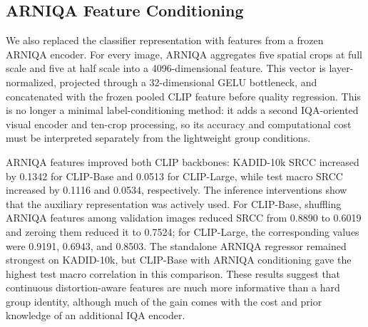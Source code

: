 \documentclass{article}
\begin{document}
\subsection{ARNIQA Feature Conditioning}

We also replaced the classifier representation with features from a frozen ARNIQA encoder. For every image, ARNIQA aggregates five spatial crops at full scale and five at half scale into a 4096-dimensional feature. This vector is layer-normalized, projected through a 32-dimensional GELU bottleneck, and concatenated with the frozen pooled CLIP feature before quality regression. This is no longer a minimal label-conditioning method: it adds a second IQA-oriented visual encoder and ten-crop processing, so its accuracy and computational cost must be interpreted separately from the lightweight group conditions.

\begin{table}[htbp]
\centering
\small
\setlength{\tabcolsep}{4pt}
\caption{ARNIQA feature conditioning. CLIP comparisons use the best KADID-10k validation checkpoint; test values are seven-dataset macro averages. The standalone official ARNIQA regressor is included as a reference rather than a capacity-matched baseline.}
\label{tab:arniqa-features}
\end{table}

ARNIQA features improved both CLIP backbones: KADID-10k SRCC increased by 0.1342 for CLIP-Base and 0.0513 for CLIP-Large, while test macro SRCC increased by 0.1116 and 0.0534, respectively. The inference interventions show that the auxiliary representation was actively used. For CLIP-Base, shuffling ARNIQA features among validation images reduced SRCC from 0.8890 to 0.6019 and zeroing them reduced it to 0.7524; for CLIP-Large, the corresponding values were 0.9191, 0.6943, and 0.8503. The standalone ARNIQA regressor remained strongest on KADID-10k, but CLIP-Base with ARNIQA conditioning gave the highest test macro correlation in this comparison. These results suggest that continuous distortion-aware features are much more informative than a hard group identity, although much of the gain comes with the cost and prior knowledge of an additional IQA encoder.
\end{document}
